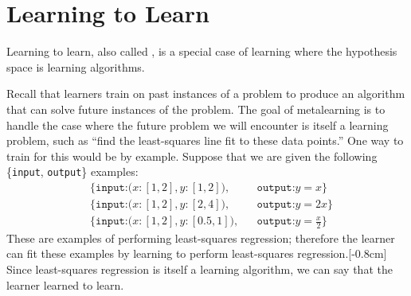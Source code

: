 \section{Learning to Learn}%

Learning to learn, also called , is a special case of learning where the hypothesis space is learning algorithms.

Recall that learners train on past instances of a problem to produce an algorithm that can solve future instances of the problem. The goal of metalearning is to handle the case where the future problem we will encounter is itself a learning problem, such as ``find the least-squares line fit to these data points.'' One way to train for this would be by example. Suppose that we are given the following \{\texttt{input}, \texttt{output}\} examples:
\begin{align}
     & \{\texttt{input:} \big(x:[1,2], y:[1,2]\big),   &  & \texttt{output:} y = x\}\nonumber           \\
     & \{\texttt{input:} \big(x:[1,2], y:[2,4]\big),   &  & \texttt{output:} y = 2x\}\nonumber          \\
     & \{\texttt{input:} \big(x:[1,2], y:[0.5,1]\big), &  & \texttt{output:} y = \frac{x}{2}\}\nonumber
\end{align}
These are examples of performing least-squares regression; therefore the learner can fit these examples by learning to perform least-squares regression.[-0.8cm] Since least-squares regression is itself a learning algorithm, we can say that the learner learned to learn.

